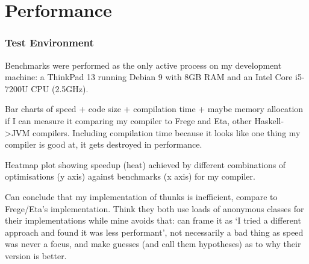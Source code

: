 \documentclass[dissertation.tex]{subfiles}
\begin{document}
\section{Performance}
{

    \subsubsection{Test Environment}\label{sec:test-environment}
    {

        Benchmarks were performed as the only active process on my development machine: a ThinkPad 13 running Debian 9
        with 8GB RAM and an Intel Core i5-7200U CPU (2.5GHz).

    }

    Bar charts of speed + code size + compilation time + maybe memory allocation if I can measure it comparing my
    compiler to Frege and Eta, other Haskell->JVM compilers. Including compilation time because it looks like one thing
    my compiler is good at, it gets destroyed in performance.

    Heatmap plot showing speedup (heat) achieved by different combinations of optimisations (y axis) against benchmarks
    (x axis) for my compiler.

    Can conclude that my implementation of thunks is inefficient, compare to Frege/Eta's implementation. Think they both
    use loads of anonymous classes for their implementations while mine avoids that: can frame it as `I tried a
    different approach and found it was less performant', not necessarily a bad thing as speed was never a focus, and
    make guesses (and call them hypotheses) as to why their version is better.




}
\end{document}
